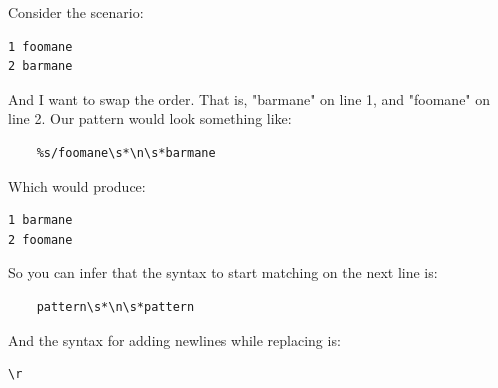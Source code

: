 \documentclass{report}
\begin{document}
    \bigbreak \noindent 
    

    \pagebreak \bigbreak \noindent
    \bigbreak \noindent 
    Consider the scenario:
    \begin{verbatim}
1 foomane
2 barmane
    \end{verbatim}
    \bigbreak \noindent 
    And I want to swap the order. That is, "barmane" on line 1, and "foomane" on line 2. Our pattern would look something like:
    \begin{verbatim}
    %s/foomane\s*\n\s*barmane
    \end{verbatim}
    \bigbreak \noindent 
    Which would produce:
    \begin{verbatim}
1 barmane
2 foomane
    \end{verbatim}
    So you can infer that the syntax to start matching on the next line is:
    \begin{verbatim}
    pattern\s*\n\s*pattern
    \end{verbatim}
    And the syntax for adding newlines while replacing is:
    \begin{verbatim}
\r
    \end{verbatim}




    
\end{document}
